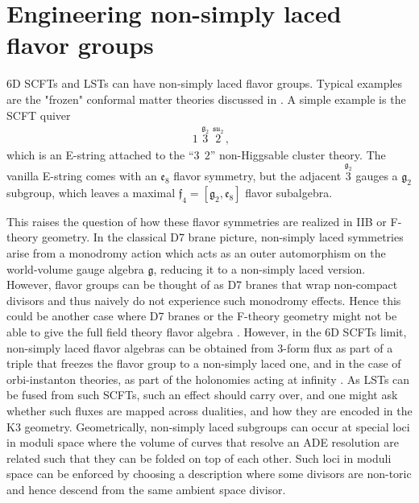 \documentclass[11pt]{article}
\numberwithin{equation}{section}
\newcommand{\fsu}{\mathfrak{su}}
\newcommand{\fg}{\mathfrak{g}}
\newcommand{\ff}{\mathfrak{f}}
\newcommand{\fe}{\mathfrak{e}}
\begin{document}
\section{Engineering non-simply laced flavor groups}
\label{sec:nsl}
6D SCFTs and LSTs can have non-simply laced flavor groups. Typical examples are the "frozen" conformal matter theories discussed in \cite{Mekareeya:2017jgc}. 
A simple example is the SCFT quiver
\begin{align}
    [\ff_4]\,\, 1 \, \, \overset{\fg_2}{3} \, \, \overset{\fsu_2}{2} \, ,
\end{align}
which is an E-string attached to the ``$3 ~~ 2$'' non-Higgsable cluster theory. The vanilla E-string comes with an $\fe_8$ flavor symmetry, but the adjacent $\overset{\fg_2}{3}$ gauges a $\fg_2$ subgroup, which leaves a maximal $\ff_4 = [\fg_2,\fe_8]$ flavor subalgebra.

This raises the question of how these flavor symmetries are realized in IIB or F-theory geometry. In the classical D7 brane picture, non-simply laced symmetries arise from a monodromy action which acts as an outer automorphism on the world-volume gauge algebra $\fg$, reducing it to a non-simply laced version. However, flavor groups can be thought of as D7 branes that wrap non-compact divisors and thus naively do not experience such monodromy effects. Hence this could be another case where D7 branes or the F-theory geometry might not be able to give the full field theory flavor algebra 
\cite{Bertolini:2015bwa}. However, in the 6D SCFTs limit, non-simply laced flavor algebras can be obtained from 3-form flux as part of a triple \cite{deBoer:2001wca} that freezes the flavor group to a non-simply laced one, and in the case of orbi-instanton theories, as part of the holonomies acting at infinity \cite{Frey:2018vpw}. As LSTs can be fused from such SCFTs, such an effect should carry over, and one might ask whether such fluxes are mapped across dualities, and how they are encoded in the K3 geometry. Geometrically, non-simply laced subgroups can occur at special loci in moduli space where the volume of curves that resolve an ADE resolution are related such that they can be folded on top of each other. Such loci in moduli space can be enforced by choosing a description where some divisors are non-toric and hence descend from the same ambient space divisor.
\end{document}
